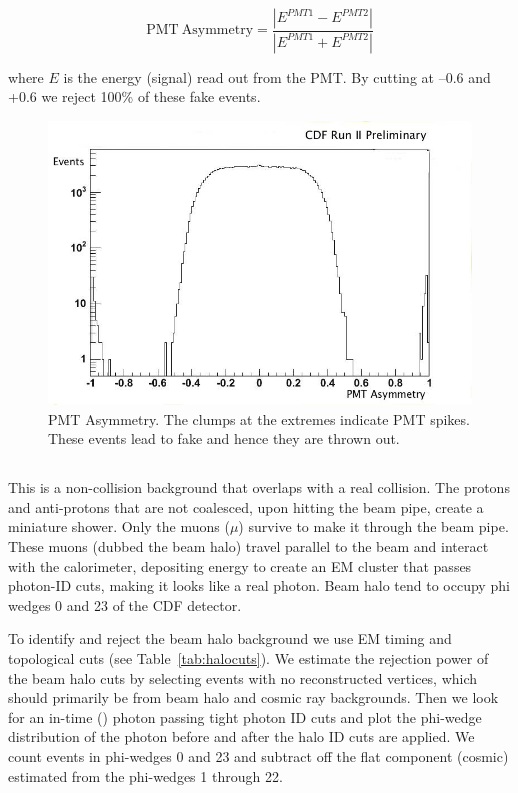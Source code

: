 \documentclass[11pt]{article}
\begin{document}
\begin{equation}
 \mathrm{PMT~Asymmetry} = \frac{|E^{PMT1} - E^{PMT2}|}{|E^{PMT1} + E^{PMT2}|} 
 \end{equation}
 
 \noindent where $E$ is the energy (signal) read out from the PMT. By cutting at --0.6 and +0.6 we reject 100\% of these fake events.

\begin{figure}
\begin{centering}
\includegraphics[scale=0.5]{PMT_EM_Asym_twrE_gt_10.jpg}
\caption{PMT Asymmetry.  The clumps at the extremes indicate PMT spikes. These events  lead to fake \met and hence they are thrown out.}
\label{fig-zht}
\end{centering}
\end{figure}


\subsection{\halojets}
This is a non-collision background that overlaps with a real collision. The protons and anti-protons that are not coalesced, upon hitting the beam pipe, create a miniature shower. Only the muons ($\mu$) survive to make it through the beam pipe. These muons (dubbed the beam halo) travel parallel to the beam and interact with the calorimeter, depositing energy to create an EM cluster that passes photon-ID cuts, making it looks like a real photon. Beam halo tend to occupy phi wedges 0 and 23 of the CDF detector.

To identify and reject the beam halo background we use EM timing and topological cuts (see Table~\ref{tab:halocuts}). We estimate the rejection power of the beam halo cuts by selecting events with no reconstructed vertices, which should primarily be from beam halo and cosmic ray backgrounds. Then we look for an in-time (\intimewindow) photon passing tight photon ID cuts and plot the phi-wedge distribution of the photon before and after the halo ID cuts are applied. We count events in phi-wedges 0 and 23 and subtract off the flat component (cosmic) estimated from the phi-wedges 1 through 22.
  
\end{document}
